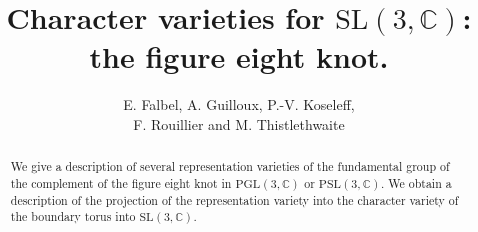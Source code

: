 \documentclass[11pt]{amsart}
\author{E. Falbel, A. Guilloux, P.-V. Koseleff,\\ F. Rouillier and M. Thistlethwaite}
\theoremstyle{definition}
\newcommand\bC{\mathbb{C}}
\newcommand\SL{\textrm{SL}}
\newcommand\PSL{\textrm{PSL}}
\newcommand\PGL{\textrm{PGL}}
\begin{document}
\title[] {Character varieties for $\SL(3,\bC)$: the figure eight knot. }

\begin{abstract}
We give a description of several representation varieties of the fundamental group of the complement of the figure eight knot in
$\PGL(3,\bC)$ or $\PSL(3,\bC)$.  We  obtain a description of the projection of the representation variety into
the character variety of the boundary torus into $\SL(3,\bC)$. 
\end{abstract}


\maketitle

%


%
\end{document}
